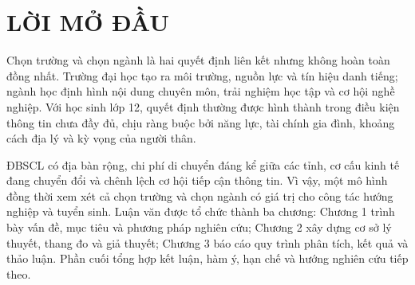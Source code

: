 \chapter*{LỜI MỞ ĐẦU}
Chọn trường và chọn ngành là hai quyết định liên kết nhưng không hoàn toàn đồng nhất. Trường đại học tạo ra môi trường, nguồn lực và tín hiệu danh tiếng; ngành học định hình nội dung chuyên môn, trải nghiệm học tập và cơ hội nghề nghiệp. Với học sinh lớp 12, quyết định thường được hình thành trong điều kiện thông tin chưa đầy đủ, chịu ràng buộc bởi năng lực, tài chính gia đình, khoảng cách địa lý và kỳ vọng của người thân.

ĐBSCL có địa bàn rộng, chi phí di chuyển đáng kể giữa các tỉnh, cơ cấu kinh tế đang chuyển đổi và chênh lệch cơ hội tiếp cận thông tin. Vì vậy, một mô hình đồng thời xem xét cả chọn trường và chọn ngành có giá trị cho công tác hướng nghiệp và tuyển sinh. Luận văn được tổ chức thành ba chương: Chương 1 trình bày vấn đề, mục tiêu và phương pháp nghiên cứu; Chương 2 xây dựng cơ sở lý thuyết, thang đo và giả thuyết; Chương 3 báo cáo quy trình phân tích, kết quả và thảo luận. Phần cuối tổng hợp kết luận, hàm ý, hạn chế và hướng nghiên cứu tiếp theo.
